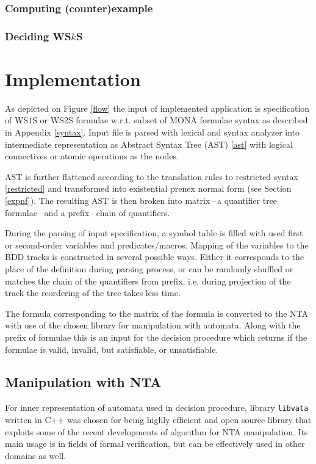 \subsection{Computing (counter)example}

\subsection{Deciding WS$k$S}

\chapter{Implementation}

As depicted on Figure \ref{flow} the input of implemented application is
specification of WS$1$S or WS$2$S formulae w.r.t. subset of \textsc{MONA}
formulae syntax as described in Appendix \ref{syntax}. Input file is parsed with
lexical and syntax analyzer into intermediate representation as Abstract Syntax
Tree (AST) \ref{ast} with logical connectives or atomic operations as the nodes. 

AST is further flattened according to the translation rules to restricted syntax
\ref{restricted} and transformed into existential prenex normal form (see
Section \ref{expnf}). The resulting AST is then broken into matrix\,--\,a
quantifier tree formulae\,--\,and a prefix\,--\,chain of quantifiers. 

During the parsing of input specification, a symbol table is filled with used
first or second-order variables and predicates/macros. Mapping of the variables
to the BDD tracks is constructed in several possible ways. Either it corresponds
to the place of the definition during parsing process, or can be randomly
shuffled or matches the chain of the quantifiers from prefix, i.e. during
projection of the track the reordering of the tree takes less time.

The formula corresponding to the matrix of the formula is converted to the NTA
with use of the chosen library for manipulation with automata. Along with the
prefix of formulae this is an input for the decision procedure which returns
if the formulae is valid, invalid, but satisfiable, or unsatisfiable.

\section{Manipulation with NTA}

For inner representation of automata used in decision procedure, library
\texttt{libvata} \cite{vata-tool} written in C++ was chosen for being highly
efficient and open source library that exploits some of the recent developments
of algorithm for NTA manipulation. Its main usage is in fields of formal
verification, but can be effectively used in other domains as well.

